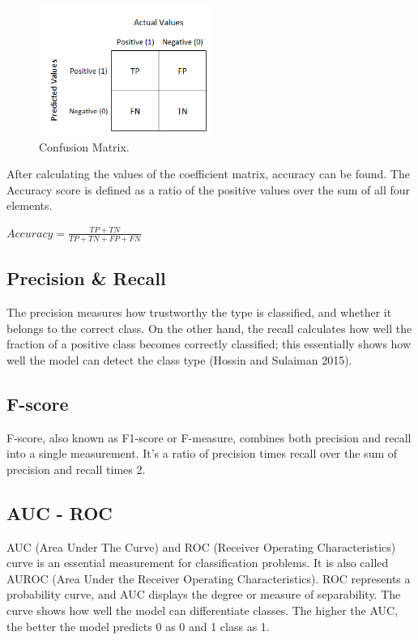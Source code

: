 \documentclass{IEEEtran}
\begin{document}
\begin{figure}[h]
\centering
\includegraphics[width=0.5\textwidth]{tp.png}
\caption{\label{fig:tp}Confusion Matrix.}
\end{figure}

After calculating the values of the coefficient matrix, accuracy can be found. The Accuracy score is defined as a ratio of the positive values over the sum of all four elements.

\begin{center}
    $Accuracy = \frac{TP + TN}{TP + TN + FP + FN}$
\end{center}


\subsection{Precision & Recall}

The precision measures how trustworthy the type is classified, and whether it belongs to the correct class. On the other hand, the recall calculates how well the fraction of a positive class becomes correctly classified; this essentially shows how well the model can detect the class type (Hossin and Sulaiman 2015).

\subsection{F-score}

F-score, also known as F1-score or F-measure, combines both precision and recall into a single measurement. It's a ratio of precision times recall over the sum of precision and recall times 2.

\subsection{AUC - ROC}

AUC (Area Under The Curve) and ROC (Receiver Operating Characteristics) curve is an essential measurement for classification problems. It is also called AUROC (Area Under the Receiver Operating Characteristics). ROC represents a probability curve, and AUC displays the degree or measure of separability. The curve shows how well the model can differentiate classes. The higher the AUC, the better the model predicts 0 as 0 and 1 class as 1. 
\end{document}
